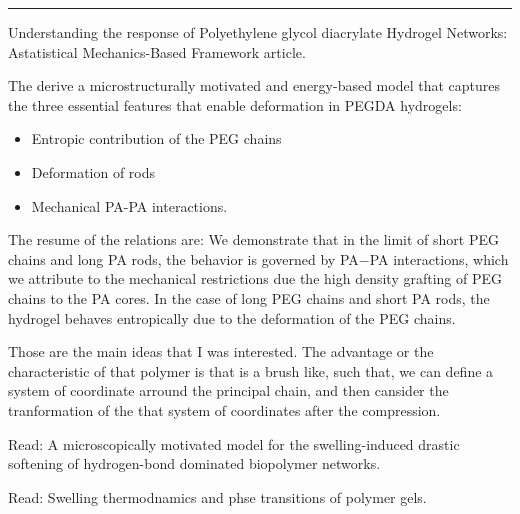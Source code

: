 \documentclass[a4paper, 11pt, oneside]{researchjournal} %
\begin{document}
\rule{\textwidth}{0.4pt}

Understanding the response of Polyethylene glycol diacrylate Hydrogel Networks: Astatistical Mechanics-Based Framework article.

The derive a microstructurally motivated and energy-based model that captures the three essential features that enable deformation in PEGDA hydrogels:
\begin{itemize}
	\item Entropic contribution of the PEG chains
	\item Deformation of rods
	\item Mechanical PA-PA interactions.
\end{itemize}

The resume of the relations are:
We demonstrate that in the limit of short PEG chains and long PA rods, the behavior is governed by PA−PA interactions, which we attribute to the mechanical restrictions due the high density grafting of PEG chains to the PA cores.
In the case of long PEG chains and short PA rods, the hydrogel behaves entropically due to the deformation of the PEG chains.

Those are the main ideas that I was interested.
The advantage or the characteristic of that polymer is that is a brush like, such that, we can define a system of coordinate arround the principal chain, and then cansider the tranformation of the that system of coordinates after the compression.

Read: A microscopically motivated model for the swelling-induced drastic softening of hydrogen-bond dominated biopolymer networks.

Read: Swelling thermodnamics and phse transitions of polymer gels.

\end{document}
